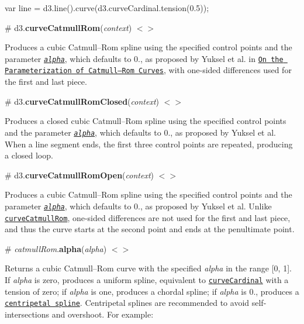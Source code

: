 \begin{DoxyCode}
var line = d3.line().curve(d3.curveCardinal.tension(0.5));
\end{DoxyCode}


\label{_curveCatmullRom}%
\# d3.{\bfseries curve\+Catmull\+Rom}({\itshape context}) \href{https://github.com/d3/d3-shape/blob/master/src/curve/catmullRom.js}{\tt $<$$>$}



Produces a cubic Catmull–\+Rom spline using the specified control points and the parameter \href{#catmullRom_alpha}{\tt {\itshape alpha}}, which defaults to 0., as proposed by Yuksel et al. in \href{http://www.cemyuksel.com/research/catmullrom_param/}{\tt On the Parameterization of Catmull–\+Rom Curves}, with one-\/sided differences used for the first and last piece.

\label{_curveCatmullRomClosed}%
\# d3.{\bfseries curve\+Catmull\+Rom\+Closed}({\itshape context}) \href{https://github.com/d3/d3-shape/blob/master/src/curve/catmullRomClosed.js}{\tt $<$$>$}



Produces a closed cubic Catmull–\+Rom spline using the specified control points and the parameter \href{#catmullRom_alpha}{\tt {\itshape alpha}}, which defaults to 0., as proposed by Yuksel et al. When a line segment ends, the first three control points are repeated, producing a closed loop.

\label{_curveCatmullRomOpen}%
\# d3.{\bfseries curve\+Catmull\+Rom\+Open}({\itshape context}) \href{https://github.com/d3/d3-shape/blob/master/src/curve/catmullRomOpen.js}{\tt $<$$>$}



Produces a cubic Catmull–\+Rom spline using the specified control points and the parameter \href{#catmullRom_alpha}{\tt {\itshape alpha}}, which defaults to 0., as proposed by Yuksel et al. Unlike \href{#curveCatmullRom}{\tt curve\+Catmull\+Rom}, one-\/sided differences are not used for the first and last piece, and thus the curve starts at the second point and ends at the penultimate point.

\label{_curveCatmullRom_alpha}%
\# {\itshape catmull\+Rom}.{\bfseries alpha}({\itshape alpha}) \href{https://github.com/d3/d3-shape/blob/master/src/curve/catmullRom.js#L83}{\tt $<$$>$}

Returns a cubic Catmull–\+Rom curve with the specified {\itshape alpha} in the range \mbox{[}0, 1\mbox{]}. If {\itshape alpha} is zero, produces a uniform spline, equivalent to \href{#curveCardinal}{\tt curve\+Cardinal} with a tension of zero; if {\itshape alpha} is one, produces a chordal spline; if {\itshape alpha} is 0., produces a \href{https://en.wikipedia.org/wiki/Centripetal_Catmull–Rom_spline}{\tt centripetal spline}. Centripetal splines are recommended to avoid self-\/intersections and overshoot. For example\+:


